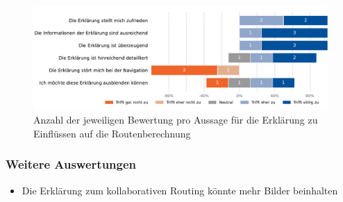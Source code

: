 \begin{figure}[htb!]
    \centering
    \includegraphics[width=\textwidth]{contents/06_model_evaluation/02_evaluation/res/qualitativeFeedback-02_collaborative_algorithm_short.pdf}
    \caption{Anzahl der jeweiligen Bewertung pro Aussage für die Erklärung zu Einflüssen auf die Routenberechnung}
    \label{fig:02_collaborative_algorithm_short}
\end{figure}

\subsubsection{Weitere Auswertungen}

\begin{itemize}
    \item Die Erklärung zum kollaborativen Routing könnte mehr Bilder beinhalten
\end{itemize}